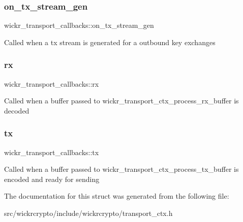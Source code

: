 \subsubsection{\texorpdfstring{on\+\_\+tx\+\_\+stream\+\_\+gen}{on\_tx\_stream\_gen}}
{\footnotesize\ttfamily wickr\+\_\+transport\+\_\+callbacks\+::on\+\_\+tx\+\_\+stream\+\_\+gen}

Called when a tx stream is generated for a outbound key exchanges \mbox{\label{structwickr__transport__callbacks_a5d523402980ac09fdf52aa4824f8e9f7}} 
\subsubsection{\texorpdfstring{rx}{rx}}
{\footnotesize\ttfamily wickr\+\_\+transport\+\_\+callbacks\+::rx}

Called when a buffer passed to wickr\+\_\+transport\+\_\+ctx\+\_\+process\+\_\+rx\+\_\+buffer is decoded \mbox{\label{structwickr__transport__callbacks_a06c4b21b847c00e92373cf1402e1cb9d}} 
\subsubsection{\texorpdfstring{tx}{tx}}
{\footnotesize\ttfamily wickr\+\_\+transport\+\_\+callbacks\+::tx}

Called when a buffer passed to wickr\+\_\+transport\+\_\+ctx\+\_\+process\+\_\+tx\+\_\+buffer is encoded and ready for sending 

The documentation for this struct was generated from the following file\+:\begin{DoxyCompactItemize}
\item 
src/wickrcrypto/include/wickrcrypto/transport\+\_\+ctx.\+h\end{DoxyCompactItemize}
